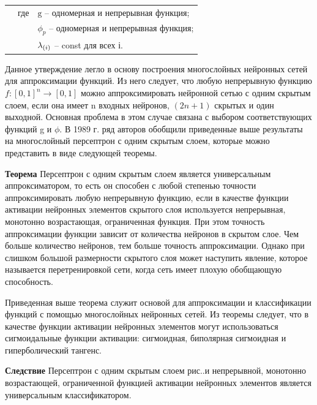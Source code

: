 	
	\begin{tabular}{p{}p{}p{}}
		& где  & $\textrm{g}$ {--} одномерная и непрерывная функция; \\
		&      & $\phi_{p}$ {--} одномерная и непрерывная функция; \\
		&      & $\lambda_{\textrm(i)}$ {--} const для всех і. \\
		\end{tabular}
	
	\par \redline Данное утверждение легло в основу построения многослойных нейронных сетей для аппроксимации функций. Из него следует, что любую непрерывную функцию $\mathit{f}:[0,1]^{n} \rightarrow [0,1] $  можно аппроксимировать нейронной сетью с одним скрытым слоем, если она имеет n входных нейронов, $(2n + 1)$ скрытых и один выходной. Основная проблема в этом случае связана с выбором соответствующих функций g и $\phi$. В 1989 г. ряд авторов обобщили приведенные выше результаты на многослойный персептрон с одним скрытым слоем, которые можно представить в виде следующей теоремы.
	
	\par \redline \textbf{Теорема} Персептрон с одним скрытым слоем является универсальным аппроксиматором, то есть он способен с любой степенью точности аппроксимировать любую непрерывную функцию, если в качестве функции активации нейронных элементов скрытого слоя используется непрерывная, монотонно возрастающая, ограниченная функция. При этом точность аппроксимации функции зависит от количества нейронов в скрытом слое. Чем больше количество нейронов, тем больше точность аппроксимации. Однако при слишком большой размерности скрытого слоя может наступить явление, которое называется перетренировкой сети, когда сеть имеет плохую обобщающую способность.
	
	\par \redline Приведенная выше теорема служит основой для аппроксимации и классификации функций с помощью многослойных нейронных сетей. Из теоремы следует, что в качестве функции активации нейронных элементов могут использоваться сигмоидальные функции активации: сигмоидная, биполярная сигмоидная и гиперболический тангенс.
	
	\par \redline \textbf{Следствие} Персептрон с одним скрытым слоем рис.\thechaptercntr.\theimagecntr \spc и непрерывной,
	монотонно возрастающей, ограниченной функцией активации нейронных элементов является универсальным классификатором.
	
